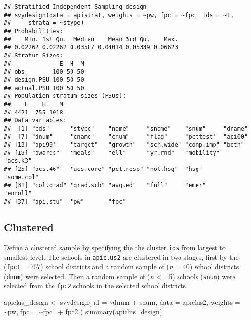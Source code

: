 \documentclass[
]{book}
\newenvironment{Shaded}{\begin{snugshade}}{\end{snugshade}}
\newcommand{\AttributeTok}[1]{\textcolor[rgb]{0.77,0.63,0.00}{#1}}
\newcommand{\FunctionTok}[1]{\textcolor[rgb]{0.00,0.00,0.00}{#1}}
\newcommand{\NormalTok}[1]{#1}
\newcommand{\OtherTok}[1]{\textcolor[rgb]{0.56,0.35,0.01}{#1}}
\newcommand{\SpecialCharTok}[1]{\textcolor[rgb]{0.00,0.00,0.00}{#1}}
\theoremstyle{definition}
\theoremstyle{definition}
\theoremstyle{definition}
\theoremstyle{definition}
\theoremstyle{remark}
\begin{document}
\begin{verbatim}
## Stratified Independent Sampling design
## svydesign(data = apistrat, weights = ~pw, fpc = ~fpc, ids = ~1, 
##     strata = ~stype)
## Probabilities:
##    Min. 1st Qu.  Median    Mean 3rd Qu.    Max. 
## 0.02262 0.02262 0.03587 0.04014 0.05339 0.06623 
## Stratum Sizes: 
##              E  H  M
## obs        100 50 50
## design.PSU 100 50 50
## actual.PSU 100 50 50
## Population stratum sizes (PSUs): 
##    E    H    M 
## 4421  755 1018 
## Data variables:
##  [1] "cds"      "stype"    "name"     "sname"    "snum"     "dname"   
##  [7] "dnum"     "cname"    "cnum"     "flag"     "pcttest"  "api00"   
## [13] "api99"    "target"   "growth"   "sch.wide" "comp.imp" "both"    
## [19] "awards"   "meals"    "ell"      "yr.rnd"   "mobility" "acs.k3"  
## [25] "acs.46"   "acs.core" "pct.resp" "not.hsg"  "hsg"      "some.col"
## [31] "col.grad" "grad.sch" "avg.ed"   "full"     "emer"     "enroll"  
## [37] "api.stu"  "pw"       "fpc"
\end{verbatim}

\hypertarget{clustered}{%
\subsection{Clustered}\label{clustered}}

Define a clustered sample by specifying the the cluster \texttt{ids} from largest to smallest level. The schools in \texttt{apiclus2} are clustered in two stages, first by the (\texttt{fpc1} = 757) school districts and a random sample of (\emph{n} = 40) school districts (\texttt{dnum}) were selected. Then a random sample of (\emph{n} \textless= 5) schools (\texttt{snum}) were selected from the \texttt{fpc2} schools in the selected school districts.

\begin{Shaded}
\begin{Highlighting}[]
\NormalTok{apiclus\_design }\OtherTok{\textless{}{-}} \FunctionTok{svydesign}\NormalTok{(}
  \AttributeTok{id =} \SpecialCharTok{\textasciitilde{}}\NormalTok{dnum }\SpecialCharTok{+}\NormalTok{ snum, }
  \AttributeTok{data =}\NormalTok{ apiclus2, }
  \AttributeTok{weights =} \SpecialCharTok{\textasciitilde{}}\NormalTok{pw, }
  \AttributeTok{fpc =} \SpecialCharTok{\textasciitilde{}}\NormalTok{fpc1 }\SpecialCharTok{+}\NormalTok{ fpc2}
\NormalTok{)}
\FunctionTok{summary}\NormalTok{(apiclus\_design)}
\end{Highlighting}
\end{Shaded}
\end{document}
